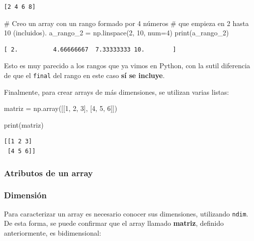 \documentclass[
  letterpaper,
  DIV=11,
  numbers=noendperiod]{scrreprt}
\newenvironment{Shaded}{\begin{snugshade}}{\end{snugshade}}
\newcommand{\BuiltInTok}[1]{\textcolor[rgb]{0.00,0.23,0.31}{#1}}
\newcommand{\CommentTok}[1]{\textcolor[rgb]{0.37,0.37,0.37}{#1}}
\newcommand{\DecValTok}[1]{\textcolor[rgb]{0.68,0.00,0.00}{#1}}
\newcommand{\NormalTok}[1]{\textcolor[rgb]{0.00,0.23,0.31}{#1}}
\newcommand{\OperatorTok}[1]{\textcolor[rgb]{0.37,0.37,0.37}{#1}}
\begin{document}
\begin{verbatim}
[2 4 6 8]
\end{verbatim}

\begin{Shaded}
\begin{Highlighting}[]
\CommentTok{\# Creo un array con un rango formado por 4 números}
\CommentTok{\# que empieza en 2 hasta 10 (incluidos). }
\NormalTok{a\_rango\_2 }\OperatorTok{=}\NormalTok{ np.linspace(}\DecValTok{2}\NormalTok{, }\DecValTok{10}\NormalTok{, num}\OperatorTok{=}\DecValTok{4}\NormalTok{)}
\BuiltInTok{print}\NormalTok{(a\_rango\_2)}
\end{Highlighting}
\end{Shaded}

\begin{verbatim}
[ 2.          4.66666667  7.33333333 10.        ]
\end{verbatim}

Esto es muy parecido a los rangos que ya vimos en Python, con la sutil
diferencia de que el \texttt{final} del rango en este caso \textbf{sí se
incluye}.

Finalmente, para crear arrays de más dimensiones, se utilizan varias
listas:

\begin{Shaded}
\begin{Highlighting}[]
\NormalTok{matriz }\OperatorTok{=}\NormalTok{ np.array([[}\DecValTok{1}\NormalTok{, }\DecValTok{2}\NormalTok{, }\DecValTok{3}\NormalTok{], [}\DecValTok{4}\NormalTok{, }\DecValTok{5}\NormalTok{, }\DecValTok{6}\NormalTok{]])}

\BuiltInTok{print}\NormalTok{(matriz)}
\end{Highlighting}
\end{Shaded}

\begin{verbatim}
[[1 2 3]
 [4 5 6]]
\end{verbatim}

\subsubsection{Atributos de un array}\label{atributos-de-un-array}

\subsubsection{Dimensión}\label{dimensiuxf3n}

Para caracterizar un array es necesario conocer sus dimensiones,
utilizando \texttt{ndim}. De esta forma, se puede confirmar que el array
llamado \textbf{matriz}, definido anteriormente, es bidimensional:
\end{document}
